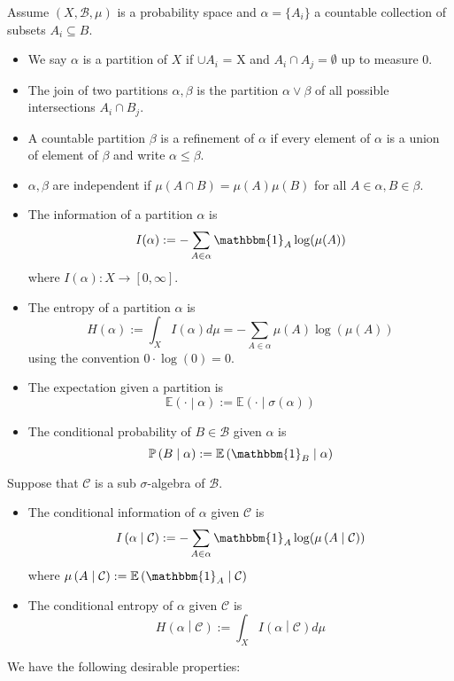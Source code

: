 \documentclass[11pt]{article}
\newcommand{\defeq}{:=}
\newcommand{\msrspc}{\ensuremath{(X,\mathcal{B},\mu)}}
\newcommand{\indic}[1]{\mathbbm{1}_{#1}}
\newcommand{\relmiddle}[1]{\mathrel{}\middle#1\mathrel{}}
\newcommand{\rmv}{\relmiddle|}
\newcommand{\gvn}[2]{\ensuremath{\left(#1\rmv#2\right)}}
\newcommand{\expg}[2]{\ensuremath{\mathbb{E}\gvn{#1}{#2}}}
\newcommand{\infog}[2]{\ensuremath{I\gvn{#1}{#2}}}
\newcommand{\entrg}[2]{\ensuremath{H\gvn{#1}{#2}}}
\newcommand{\probg}[2]{\ensuremath{\mathbb{P}\gvn{#1}{#2}}}
\newenvironment{defin}
	{\begin{mdframed}[backgroundcolor=white, roundcorner=5pt, linewidth=1pt, linecolor=RoyalBlue]}
	{\end{mdframed}}
\newcommand{\mdf}[1]{{\color{RoyalBlue} #1}}
\begin{document}
\begin{defin}
Assume $\msrspc$ is a probability space and $\alpha=\{A_i\}$ a countable collection of subsets $A_i\subseteq B$.
\begin{itemize}
	\item We say $\alpha$ is a \mdf{partition} of $X$ if $\cup A_i$ = X and $A_i\cap A_j=\emptyset$ up to measure 0.
	\item The \mdf{join} of two partitions $\alpha,\beta$ is the partition $\alpha\vee\beta$ of all possible intersections $A_i\cap B_j$.
	\item A countable partition $\beta$ is a \mdf{refinement} of $\alpha$ if every element of $\alpha$ is a union of element of $\beta$ and write $\alpha\leq\beta$.
	\item $\alpha,\beta$ are \mdf{independent} if $\mu(A\cap B)=\mu(A)\mu(B)$ for all $A\in\alpha, B\in\beta$.
	\item The \mdf{information of a partition} $\alpha$ is
		$$I(\alpha)\defeq-\sum_{A\in\alpha}\indic{A}\log(\mu(A))$$
		where $I(\alpha):X\to[0,\infty]$.
	\item The \mdf{entropy of a partition} $\alpha$ is
		$$H(\alpha)\defeq\int_X I(\alpha)d\mu=-\sum_{A\in\alpha}\mu(A)\log(\mu(A))$$
		using the convention $0\cdot\log(0)=0$.
	\item The \mdf{expectation given a partition} is
		$$\expg{\cdot}{\alpha}\defeq\expg{\cdot}{\sigma(\alpha)}$$
	\item The \mdf{conditional probability} of $B\in\mathcal{B}$ given $\alpha$ is
		$$\probg{B}{\alpha}\defeq\expg{\indic{B}}{\alpha}$$
\end{itemize}
Suppose that $\mathcal{C}$ is a sub $\sigma$-algebra of $\mathcal{B}$.
\begin{itemize}
	\item The \mdf{conditional information of $\alpha$ given $\mathcal{C}$} is
		$$\infog{\alpha}{\mathcal{C}}\defeq - \sum_{A\in\alpha}\indic{A}\log(\mu\gvn{A}{\mathcal{C}})$$
	where $\mu\gvn{A}{\mathcal{C}}\defeq\expg{\indic{A}}{\mathcal{C}}$
	\item The \mdf{conditional entropy of $\alpha$ given $\mathcal{C}$} is
			$$\entrg{\alpha}{\mathcal{C}}\defeq\int_X\infog{\alpha}{\mathcal{C}}d\mu$$	
\end{itemize}
\end{defin}
We have the following desirable properties:
\end{document}
